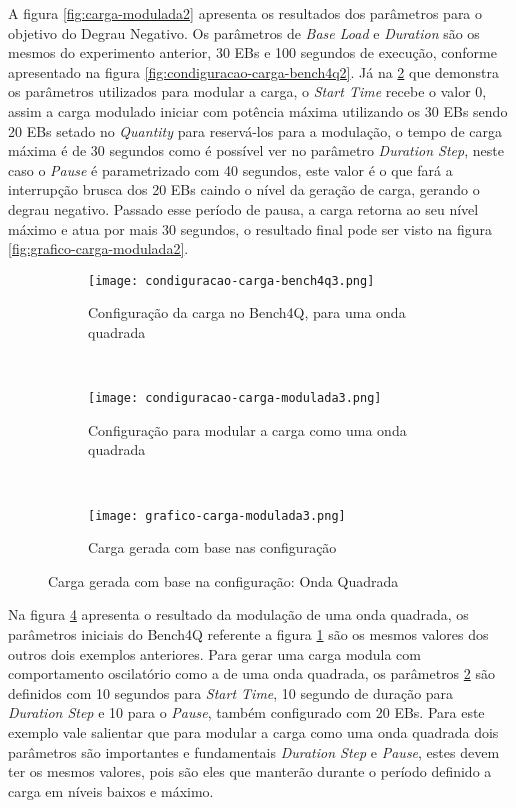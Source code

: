 A figura \ref{fig:carga-modulada2} apresenta os resultados dos parâmetros para o objetivo do Degrau Negativo. Os parâmetros de \textit{Base Load} e \textit{Duration} são os mesmos do experimento anterior, 30 EBs e 100 segundos de execução, conforme apresentado na figura \ref{fig:condiguracao-carga-bench4q2}. Já na \ref{fig:condiguracao-carga-modulada3} que demonstra os parâmetros utilizados para modular a carga, o \textit{Start Time} recebe o valor 0, assim a carga modulado iniciar com potência máxima utilizando os 30 EBs sendo 20 EBs setado no \textit{Quantity} para reservá-los para a modulação, o tempo de carga máxima é de 30 segundos como é possível ver no parâmetro \textit{Duration Step}, neste caso o \textit{Pause} é parametrizado com 40 segundos, este valor é o que fará a interrupção brusca dos 20 EBs caindo o nível da geração de carga, gerando o degrau negativo. Passado esse período de pausa, a carga retorna ao seu nível máximo e atua por mais 30 segundos, o resultado final pode ser visto na figura \ref{fig:grafico-carga-modulada2}. 

\begin{figure}[!htb]
	\begin{subfigure}{\linewidth}
		\centering
		\texttt{[image: condiguracao-carga-bench4q3.png]}
		\caption{Configuração da carga no Bench4Q, para uma onda quadrada}
		\label{fig:condiguracao-carga-bench4q3}
	\end{subfigure}\\
	\begin{subfigure}{\linewidth}
		\centering
		\texttt{[image: condiguracao-carga-modulada3.png]}
		\caption{Configuração para modular a carga como uma onda quadrada}
		\label{fig:condiguracao-carga-modulada3}
	\end{subfigure}\\[1ex]
	\begin{subfigure}{\linewidth}
		\centering
		\texttt{[image: grafico-carga-modulada3.png]}
		\caption{Carga gerada com base nas configuração}
		\label{fig:grafico-carga-modulada3}
	\end{subfigure}
	\caption{Carga gerada com base na configuração: Onda Quadrada}
	\label{fig:carga-modulada3}
	\fautor
\end{figure}

Na figura \ref{fig:carga-modulada3} apresenta o resultado da modulação de uma onda quadrada, os parâmetros iniciais do Bench4Q referente a figura \ref{fig:condiguracao-carga-bench4q3} são os mesmos valores dos outros dois exemplos anteriores. Para gerar uma carga modula com comportamento oscilatório como a de uma onda quadrada, os parâmetros \ref{fig:condiguracao-carga-modulada3} são definidos com 10 segundos para \textit{Start Time}, 10 segundo de duração para \textit{Duration Step} e 10 para o \textit{Pause}, também configurado com 20 EBs. Para este exemplo vale salientar que para modular a carga como uma onda quadrada dois parâmetros são importantes e fundamentais \textit{Duration Step} e \textit{Pause}, estes devem ter os mesmos valores, pois são eles que manterão durante o período definido a carga em níveis baixos e máximo. 

